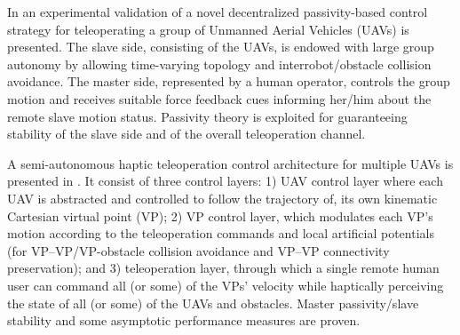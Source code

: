 In \cite{group-teleoperation} an experimental validation of a novel decentralized passivity-based control strategy for teleoperating a group of Unmanned Aerial Vehicles (UAVs) is presented. The slave side, consisting of the UAVs, is endowed with large group autonomy by allowing time-varying topology and interrobot/obstacle collision avoidance. The master side, represented by a human operator, controls the group motion and receives suitable force feedback cues informing her/him about the remote slave motion status. Passivity theory is exploited for guaranteeing stability of the slave side and of the overall teleoperation channel.

A semi-autonomous haptic teleoperation control architecture for multiple UAVs is presented in \cite{haptic-teleoperation-uav}. It consist of three control layers: 1) UAV control layer where each UAV is abstracted and controlled to follow the trajectory of, its own kinematic Cartesian virtual point (VP); 2) VP control layer, which modulates each VP’s motion according to the teleoperation commands and local artificial potentials (for VP–VP/VP-obstacle collision avoidance and VP–VP connectivity preservation); and 3) teleoperation layer, through which a single remote human user can command all (or some) of the VPs’ velocity while haptically perceiving the state of all (or some) of the UAVs and obstacles. Master passivity/slave stability and some asymptotic performance measures are proven. 